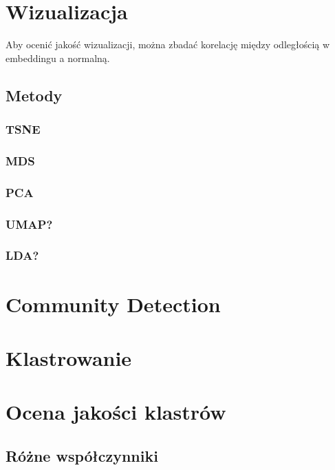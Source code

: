 \documentclass{article}
\begin{document}
\section{Wizualizacja}

Aby ocenić jakość wizualizacji, można zbadać korelację między odległością w
embeddingu a normalną.

\subsection{Metody}

\subsubsection{TSNE}

\subsubsection{MDS}

\subsubsection{PCA}

\subsubsection{UMAP?}

\subsubsection{LDA?}

\section{Community Detection}

\section{Klastrowanie}

\section{Ocena jakości klastrów}

\subsection{Różne współczynniki}
\end{document}
